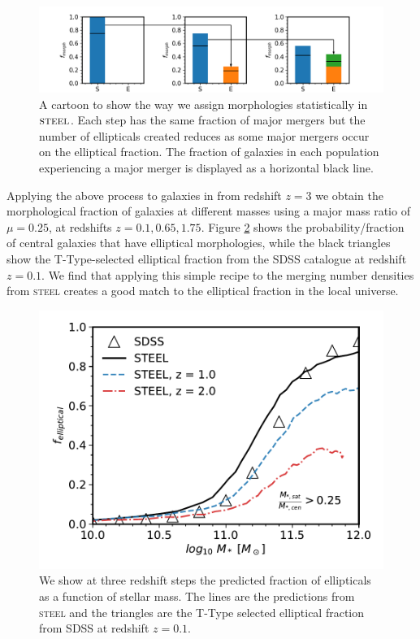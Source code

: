 \begin{figure}[h]
	\centering
	\includegraphics[width = \linewidth]{Figures/Chapter5/Morphology_Evolution.png}
	\caption{A cartoon to show the way we assign morphologies statistically in $\textsc{steel}$. Each step has the same fraction of major mergers but the number of ellipticals created reduces as some major mergers occur on the elliptical fraction. The fraction of galaxies in each population experiencing a major merger is displayed as a horizontal black line.}
	\label{fig:Gal_Morph_toon}
\end{figure}

Applying the above process to galaxies in \steel from redshift $z = 3$ we obtain the morphological fraction of galaxies at different masses using a major mass ratio of $\mu = 0.25$, at redshifts $z = 0.1, 0.65, 1.75$. Figure \ref{fig:Gal_Morph} shows the probability/fraction of central galaxies that have elliptical morphologies, while the black triangles show the T-Type-selected elliptical fraction from the SDSS catalogue at redshift $z = 0.1$. We find that applying this simple recipe to the merging number densities from \textsc{steel} creates a good match to the elliptical fraction in the local universe.

\begin{figure}[h]
	\centering
	\includegraphics[width = \linewidth]{Figures/Chapter5/GalaxyMorphologies.pdf}
	\caption{We show at three redshift steps the predicted fraction of ellipticals as a function of stellar mass. The lines are the predictions from \textsc{steel} and the triangles are the T-Type selected elliptical fraction from SDSS at redshift $z = 0.1$.}
	\label{fig:Gal_Morph}
\end{figure}


